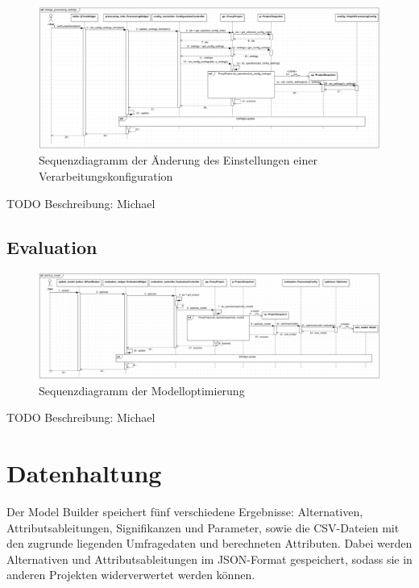 \documentclass{article}
\begin{document}
\begin{figure}[H]%
    \centering
    \includegraphics[width=13cm]{entwurf/Entwurf_dokument/img/Michael/sd_change_processing_settings.png}
    \caption{Sequenzdiagramm der Änderung des Einstellungen einer Verarbeitungskonfiguration}
\end{figure}

TODO Beschreibung: Michael


\subsection{Evaluation}

\begin{figure}[H]%
    \centering
    \includegraphics[width=13cm]{entwurf/Entwurf_dokument/img/Michael/sd_optimize_model.png}
    \caption{Sequenzdiagramm der Modelloptimierung}
\end{figure}

TODO Beschreibung: Michael


\section{Datenhaltung}

Der Model Builder speichert fünf verschiedene Ergebnisse: Alternativen, Attributsableitungen, Signifikanzen und Parameter, sowie die CSV-Dateien mit den zugrunde liegenden Umfragedaten und berechneten Attributen. Dabei werden Alternativen und Attributsableitungen im JSON-Format gespeichert, sodass sie in anderen Projekten widerverwertet werden können.
\end{document}
